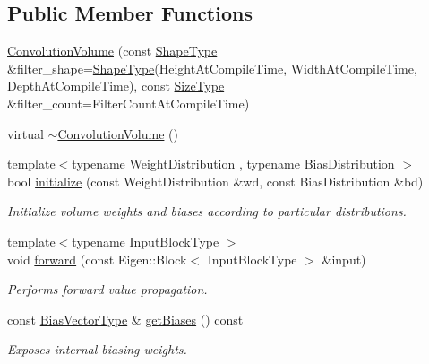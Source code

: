 \subsection*{Public Member Functions}
\begin{DoxyCompactItemize}
\item 
\hyperlink{classffnn_1_1layer_1_1_convolution_volume_a88d8d17c780f2b1bd3abe86c9daa432f}{Convolution\-Volume} (const \hyperlink{classffnn_1_1layer_1_1_convolution_volume_ae31080a107422dcfaff38eafadd69494}{Shape\-Type} \&filter\-\_\-shape=\hyperlink{classffnn_1_1layer_1_1_convolution_volume_ae31080a107422dcfaff38eafadd69494}{Shape\-Type}(Height\-At\-Compile\-Time, Width\-At\-Compile\-Time, Depth\-At\-Compile\-Time), const \hyperlink{classffnn_1_1layer_1_1_convolution_volume_abddc276f0405f5c0d70de3e43c2824d9}{Size\-Type} \&filter\-\_\-count=Filter\-Count\-At\-Compile\-Time)
\item 
virtual \hyperlink{classffnn_1_1layer_1_1_convolution_volume_aae850d568162b8f74cd1ef134d0a88bf}{$\sim$\-Convolution\-Volume} ()
\item 
{\footnotesize template$<$typename Weight\-Distribution , typename Bias\-Distribution $>$ }\\bool \hyperlink{classffnn_1_1layer_1_1_convolution_volume_a6a93e80ff524cb501e106cff63819165}{initialize} (const Weight\-Distribution \&wd, const Bias\-Distribution \&bd)
\begin{DoxyCompactList}\small\item\em Initialize volume weights and biases according to particular distributions. \end{DoxyCompactList}\item 
{\footnotesize template$<$typename Input\-Block\-Type $>$ }\\void \hyperlink{classffnn_1_1layer_1_1_convolution_volume_ad4659abd7e536b6b7e6c61ae2a0299b1}{forward} (const Eigen\-::\-Block$<$ Input\-Block\-Type $>$ \&input)
\begin{DoxyCompactList}\small\item\em Performs forward value propagation. \end{DoxyCompactList}\item 
const \hyperlink{classffnn_1_1layer_1_1_convolution_volume_ac2655aee05415e5ffc76cf7b0ba64e61}{Bias\-Vector\-Type} \& \hyperlink{classffnn_1_1layer_1_1_convolution_volume_ae1dbed16d230d7ecc8d05e82cc5b087b}{get\-Biases} () const 
\begin{DoxyCompactList}\small\item\em Exposes internal biasing weights. \end{DoxyCompactList}\item 

\end{DoxyCompactItemize}
